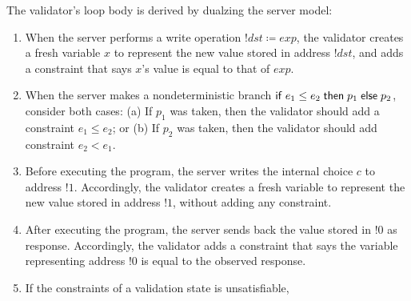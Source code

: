 The validator's loop body is derived by dualzing the server model:
\begin{enumerate}
  \item When the server performs a write operation $!dst\coloneqq exp$, the
    validator creates a fresh variable $x$ to represent the new value stored in
    address $!dst$, and adds a constraint that says $x$'s value is equal to that
    of $exp$.
  \item When the server makes a nondeterministic branch $\mathsf{if}\; e_1\le e_2\;\mathsf{then}\;
    p_1\;\mathsf{else}\; p_2$, consider both cases: (a) If $p_1$ was taken, then the
    validator should add a constraint $e_1\le e_2$; or (b) If $p_2$ was taken,
    then the validator should add constraint $e_2<e_1$.
  \item Before executing the program, the server writes the internal
    choice $c$ to address $!1$.  Accordingly, the validator creates a fresh
    variable to represent the new value stored in address $!1$, without adding
    any constraint.
  \item After executing the program, the server sends back the value stored in
    $!0$ as response.  Accordingly, the validator adds a constraint that says
    the variable representing address $!0$ is equal to the observed response.
  \item If the constraints of a validation state is unsatisfiable, 
\end{enumerate}

